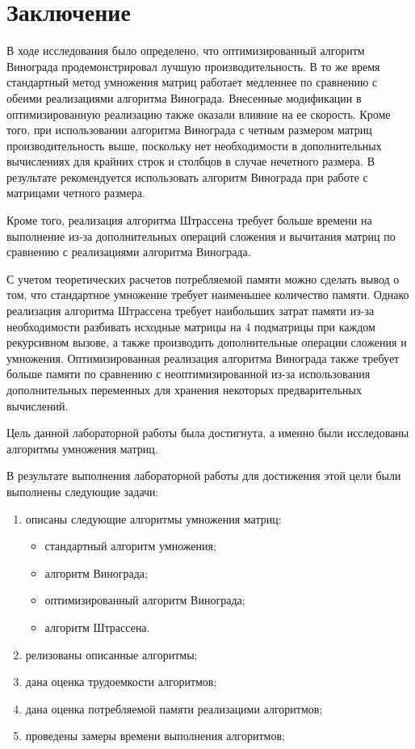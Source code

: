 \chapter*{Заключение}

В ходе исследования было определено, что оптимизированный алгоритм Винограда продемонстрировал лучшую производительность. 
В то же время стандартный метод умножения матриц работает медленнее по сравнению с обеими реализациями алгоритма Винограда. 
Внесенные модификации в оптимизированную реализацию также оказали влияние на ее скорость. 
Кроме того, при использовании алгоритма Винограда с четным размером матриц производительность выше, поскольку нет необходимости в дополнительных вычислениях для крайних строк и столбцов в случае нечетного размера. 
В результате рекомендуется использовать алгоритм Винограда при работе с матрицами четного размера.

Кроме того, реализация алгоритма Штрассена требует больше времени на выполнение из-за дополнительных операций сложения и вычитания матриц по сравнению с реализациями алгоритма Винограда.

С учетом теоретических расчетов потребляемой памяти можно сделать вывод о том, что стандартное умножение требует наименьшее количество памяти. 
Однако реализация алгоритма Штрассена требует наибольших затрат памяти из-за необходимости разбивать исходные матрицы на 4 подматрицы при каждом рекурсивном вызове, а также производить дополнительные операции сложения и умножения. 
Оптимизированная реализация алгоритма Винограда также требует больше памяти по сравнению с неоптимизированной из-за использования дополнительных переменных для хранения некоторых предварительных вычислений. 

Цель данной лабораторной работы была достигнута, а именно были исследованы алгоритмы умножения матриц.

В результате выполнения лабораторной работы для достижения этой цели были выполнены следующие задачи:
\begin{enumerate}
    \item описаны следующие алгоритмы умножения матриц:
        \begin{itemize}
            \item стандартный алгоритм умножения;
            \item алгоритм Винограда;
            \item оптимизированный алгоритм Винограда;
            \item алгоритм Штрассена.
        \end{itemize}
    \item релизованы описанные алгоритмы;
    \item дана оценка трудоемкости алгоритмов;
    \item дана оценка потребляемой памяти реализацими алгоритмов;
    \item проведены замеры времени выполнения алгоритмов;
\end{enumerate}

